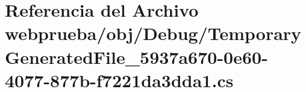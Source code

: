 \hypertarget{webprueba_2obj_2_debug_2_temporary_generated_file__5937a670-0e60-4077-877b-f7221da3dda1_8cs}{}\section{Referencia del Archivo webprueba/obj/\+Debug/\+Temporary\+Generated\+File\+\_\+5937a670-\/0e60-\/4077-\/877b-\/f7221da3dda1.cs}
\label{webprueba_2obj_2_debug_2_temporary_generated_file__5937a670-0e60-4077-877b-f7221da3dda1_8cs}
